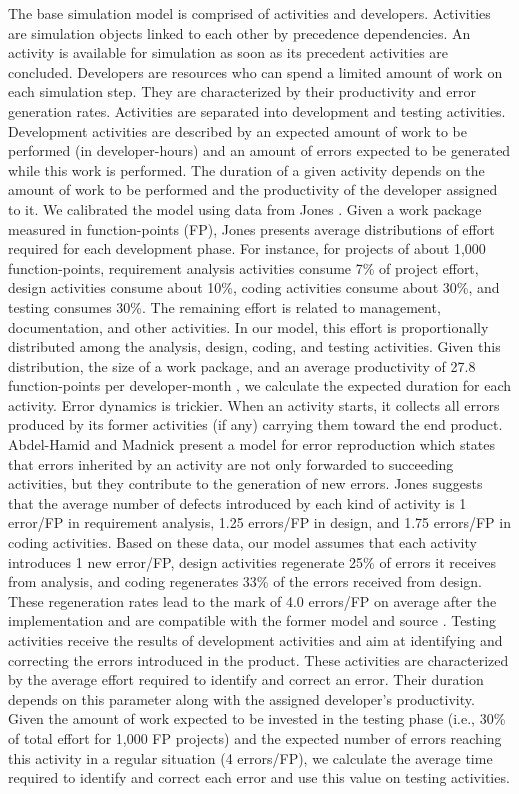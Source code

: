 \documentclass[conference]{IEEEtran}
\begin{document}
The base simulation model is comprised of activities and developers. Activities are simulation objects linked to each other by precedence dependencies. An activity is available for simulation as soon as its precedent activities are concluded. Developers are resources who can spend a limited amount of work on each simulation step. They are characterized by their productivity and error generation rates.
Activities are separated into development and testing activities. Development activities are described by an expected amount of work to be performed (in developer-hours) and an amount of errors expected to be generated while this work is performed. The duration of a given activity depends on the amount of work to be performed and the productivity of the developer assigned to it. We calibrated the model using data from Jones \cite{Jones:2000}. Given a work package measured in function-points (FP), Jones \cite{Jones:2000} presents average distributions of effort required for each development phase. For instance, for projects of about 1,000 function-points, requirement analysis activities consume 7\% of project effort, design activities consume about 10\%, coding activities consume about 30\%, and testing consumes 30\%. The remaining effort is related to management, documentation, and other activities. In our model, this effort is proportionally distributed among the analysis, design, coding, and testing activities. Given this distribution, the size of a work package, and an average productivity of 27.8 function-points per developer-month \cite{Jones:2000}, we calculate the expected duration for each activity.
Error dynamics is trickier. When an activity starts, it collects all errors produced by its former activities (if any) carrying them toward the end product. Abdel-Hamid and Madnick \cite{Abdel-Hamid:1991} present a model for error reproduction which states that errors inherited by an activity are not only forwarded to succeeding activities, but they contribute to the generation of new errors. Jones \cite{Jones:2000} suggests that the average number of defects introduced by each kind of activity is 1 error/FP in requirement analysis, 1.25 errors/FP in design, and 1.75 errors/FP in coding activities. Based on these data, our model assumes that each activity introduces 1 new error/FP, design activities regenerate 25\% of errors it receives from analysis, and coding regenerates 33\% of the errors received from design. These regeneration rates lead to the mark of 4.0 errors/FP on average after the implementation and are compatible with the former model \cite{Abdel-Hamid:1991} and source \cite{Jones:2000}.
Testing activities receive the results of development activities and aim at identifying and correcting the errors introduced in the product. These activities are characterized by the average effort required to identify and correct an error. Their duration depends on this parameter along with the assigned developer’s productivity. Given the amount of work expected to be invested in the testing phase \cite{Jones:2000} (i.e., 30\% of total effort for 1,000 FP projects) and the expected number of errors reaching this activity in a regular situation (4 errors/FP), we calculate the average time required to identify and correct each error and use this value on testing activities.
\end{document}
